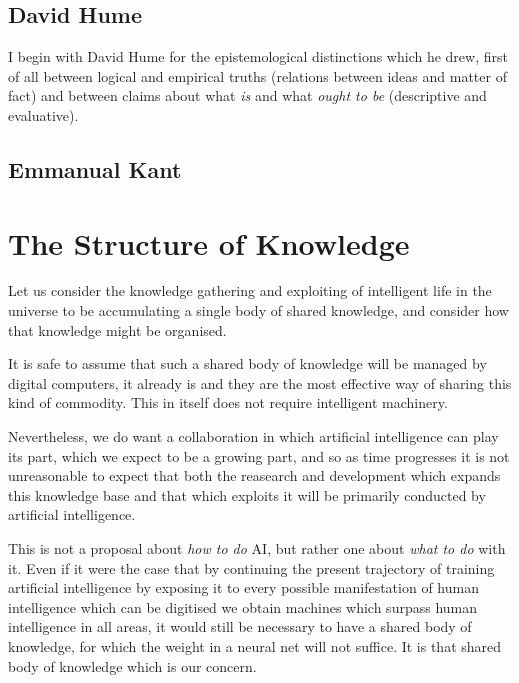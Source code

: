 \documentclass[10pt,titlepage]{book}
\begin{document}
\subsection{}

\subsection{David Hume}

I begin with David Hume for the epistemological distinctions which he drew, first of all between logical and empirical truths (relations between ideas and matter of fact) and between claims about what \emph{is} and what \emph{ought to be} (descriptive and evaluative).

\subsection{Emmanual Kant}



\section{The Structure of Knowledge}

Let us consider the knowledge gathering and exploiting of intelligent life in the universe to be accumulating a single body of shared knowledge, and consider how that knowledge might be organised.

It is safe to assume that such a shared body of knowledge will be managed by digital computers, it already is and they are the most effective way of sharing this kind of commodity.
This in itself does not require intelligent machinery.

Nevertheless, we do want a collaboration in which artificial intelligence can play its part, which we expect to be a growing part, and so as time progresses it is not unreasonable to expect that both the reasearch and development which expands this knowledge base and that which exploits it will be primarily conducted by artificial intelligence.

This is not a proposal about \emph{how to do} AI, but rather one about \emph{what to do} with it.
Even if it were the case that by continuing the present trajectory of training artificial intelligence by exposing it to every possible manifestation of human intelligence which can be digitised we obtain machines which surpass human intelligence in all areas, it would still be necessary to have a shared body of knowledge, for which the weight  in a neural net will not suffice.
It is that shared body of knowledge which is our concern.
\end{document}
